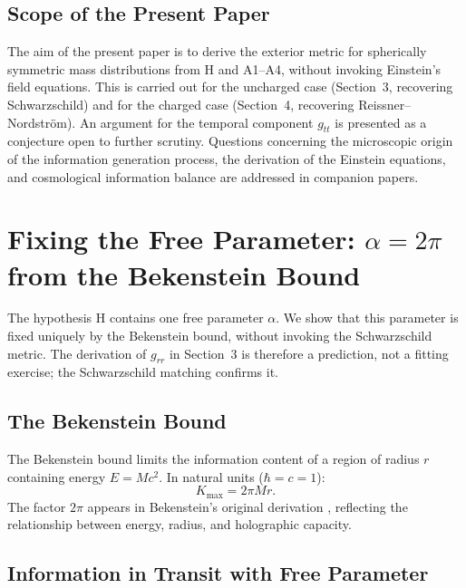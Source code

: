 \documentclass[12pt]{article}
\begin{document}
\subsection{Scope of the Present Paper}
\label{sec:scope}

The aim of the present paper is to derive the exterior metric for
spherically symmetric mass distributions from H and A1--A4, without
invoking Einstein's field equations.
This is carried out for the uncharged case (Section~3, recovering
Schwarzschild) and for the charged case (Section~4, recovering
Reissner--Nordstr\"om).
An argument for the temporal component $g_{tt}$ is presented as a
conjecture open to further scrutiny.
Questions concerning the microscopic origin of the information
generation process, the derivation of the Einstein equations, and
cosmological information balance are addressed in companion papers.

\section{Fixing the Free Parameter: $\alpha = 2\pi$ from the
Bekenstein Bound}
\label{sec:alpha}

The hypothesis H contains one free parameter $\alpha$.
We show that this parameter is fixed uniquely by the Bekenstein bound,
without invoking the Schwarzschild metric.
The derivation of $g_{rr}$ in Section~3 is therefore a prediction, not
a fitting exercise; the Schwarzschild matching confirms it.

\subsection{The Bekenstein Bound}

The Bekenstein bound limits the information content of a region of
radius $r$ containing energy $E = Mc^2$.
In natural units ($\hbar = c = 1$):
\begin{equation}
  K_{\max} = 2\pi Mr.
  \label{eq:bekenstein-bound}
\end{equation}
The factor $2\pi$ appears in Bekenstein's original derivation
\cite{Bekenstein1981}, reflecting the relationship between energy,
radius, and holographic capacity.

\subsection{Information in Transit with Free Parameter}
\end{document}
